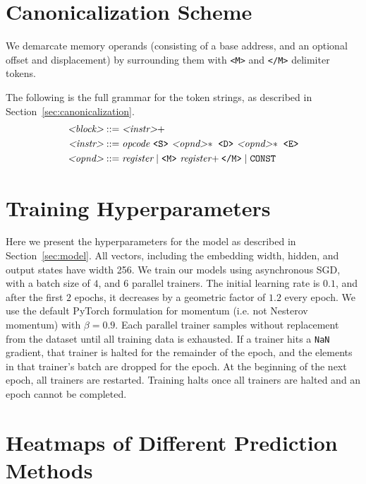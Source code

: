 \appendix

\section{Canonicalization Scheme}
\label{app:token-grammar}

We demarcate memory operands (consisting of a base address, and an optional offset and displacement) by surrounding them with \texttt{<M>} and \texttt{</M>} delimiter tokens.


The following is the full grammar for the token strings, as described in Section~\ref{sec:canonicalization}.
\begin{align*}
  \textit{<block>} &::= \textit{<instr>}+\\
  \textit{<instr>} &::= \textit{opcode}\ \texttt{<S>}\ \textit{<opnd>}\hspace{-.2em}*\ \texttt{<D>}\ \textit{<opnd>}\hspace{-.2em}*\ \texttt{<E>} \\
  \textit{<opnd>} &::= \textit{register} \; | \; \texttt{<M>}\ \textit{register}\hspace{-.2em}+ \texttt{</M>} \; | \; \texttt{CONST}
\end{align*}

\section{Training Hyperparameters}
\label{app:hyperparams}

Here we present the hyperparameters for the model as described in Section~\ref{sec:model}.
All vectors, including the embedding width, hidden, and output states have width 256.
We train our models using asynchronous SGD, with a batch size of $4$, and $6$ parallel trainers.
The initial learning rate is $0.1$, and after the first $2$ epochs, it decreases by a geometric factor of $1.2$ every epoch.
We use the default PyTorch formulation for momentum (i.e. not Nesterov momentum) with $\beta=0.9$.
Each parallel trainer samples without replacement from the dataset until all training data is exhausted.
If a trainer hits a \texttt{NaN} gradient, that trainer is halted for the remainder of the epoch, and the elements in that trainer's batch are dropped for the epoch.
At the beginning of the next epoch, all trainers are restarted.
Training halts once all trainers are halted and an epoch cannot be completed.

\section{Heatmaps of Different Prediction Methods}
\label{app:heatmaps}

